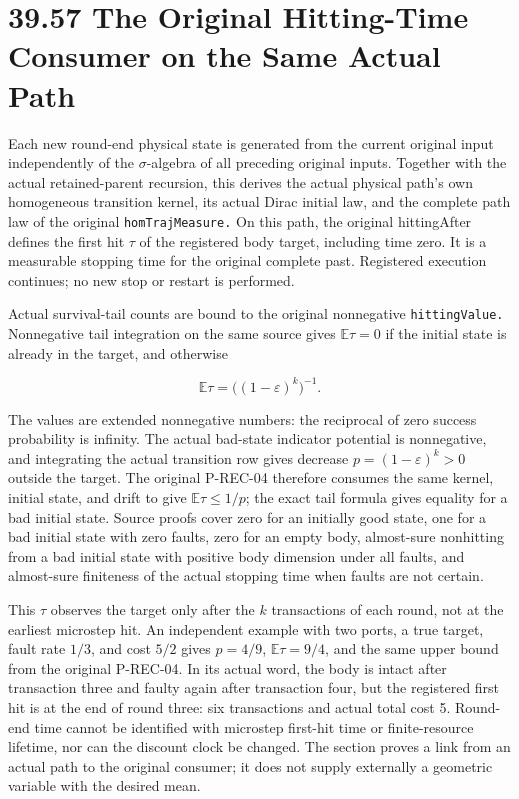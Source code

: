 \documentclass[
  english,
  11pt,
  oneside]{book}
\begin{document}
\section{39.57 The Original Hitting-Time Consumer on the Same Actual Path}\label{the-original-hitting-time-consumer-on-the-same-actual-path}

Each new round-end physical state is generated from the current original input independently of the \(\sigma\)-algebra of all preceding original inputs. Together with the actual retained-parent recursion, this derives the actual physical path's own homogeneous transition kernel, its actual Dirac initial law, and the complete path law of the original \nolinkurl{homTrajMeasure.} On this path, the original hittingAfter defines the first hit \(\tau\) of the registered body target, including time zero. It is a measurable stopping time for the original complete past. Registered execution continues; no new stop or restart is performed.

Actual survival-tail counts are bound to the original nonnegative \nolinkurl{hittingValue.} Nonnegative tail integration on the same source gives \(\mathbb E\tau=0\) if the initial state is already in the target, and otherwise

\[\mathbb E\tau=\bigl((1-\varepsilon)^k\bigr)^{-1}.\]

The values are extended nonnegative numbers: the reciprocal of zero success probability is infinity. The actual bad-state indicator potential is nonnegative, and integrating the actual transition row gives decrease \(p=(1-\varepsilon)^k>0\) outside the target. The original P-REC-04 therefore consumes the same kernel, initial state, and drift to give \(\mathbb E\tau\le1/p\); the exact tail formula gives equality for a bad initial state. Source proofs cover zero for an initially good state, one for a bad initial state with zero faults, zero for an empty body, almost-sure nonhitting from a bad initial state with positive body dimension under all faults, and almost-sure finiteness of the actual stopping time when faults are not certain.

This \(\tau\) observes the target only after the \(k\) transactions of each round, not at the earliest microstep hit. An independent example with two ports, a true target, fault rate \(1/3\), and cost \(5/2\) gives \(p=4/9\), \(\mathbb E\tau=9/4\), and the same upper bound from the original P-REC-04. In its actual word, the body is intact after transaction three and faulty again after transaction four, but the registered first hit is at the end of round three: six transactions and actual total cost 5. Round-end time cannot be identified with microstep first-hit time or finite-resource lifetime, nor can the discount clock be changed. The section proves a link from an actual path to the original consumer; it does not supply externally a geometric variable with the desired mean.
\end{document}
